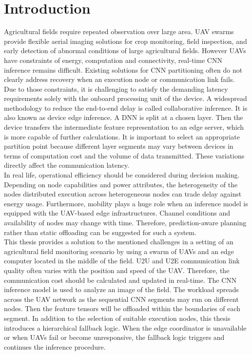 \chapter{Introduction}

Agricultural fields require repeated observation over large area. UAV swarms provide flexible aerial imaging solutions for crop monitoring, field inspection, and early detection of abnormal conditions of large agricultural fields. However UAVs have constraints of energy, computation and connectivity, real-time CNN inference remains difficult. Existing solutions for CNN partitioning often do not clearly address recovery when an execution node or communication link fails.\\

Due to those constraints, it is challenging to satisfy the demanding latency requirements solely with the onboard processing unit of the device. A widespread methodology to reduce the end-to-end delay is called collaborative inference. It is also known as device edge inference. A DNN is split at a chosen layer. Then the device transfers the intermediate feature representation to an edge server, which is more capable of further calculations. It is important to select an appropriate partition point because different layer segments may vary between devices in terms of computation cost and the volume of data transmitted. These variations directly affect the communication latency\cite{Mu2024FineGrain}. \\

In real life, operational efficiency should be considered during decision making. Depending on node capabilities and power attributes, the heterogeneity of the nodes distributed execution across heterogeneous nodes can trade delay against energy usage. Furthermore, mobility plays a huge role when an inference model is equipped with the UAV-based edge infrastructures. Channel conditions and availability of nodes may change with time. Therefore, prediction-aware planning rather than static offloading can be suggested for such a system\cite{EnergyEffUAV}.\\


This thesis provides a solution to the mentioned challenges in a setting of an agricultural field monitoring scenario by using a swarm of UAVs and an edge computer located in the middle of the field. U2U and U2E communication link quality often varies with the position and speed of the UAV. Therefore, the communication cost should be calculated and updated in real-time. The CNN inference model is used to analyze an image of the field. The workload spreads across the UAV network as the sequential CNN segments may run on different nodes. Then the feature tensors will be offloaded within the boundaries of each segment. In addition to the selection of suitable execution nodes, this thesis introduces a hierarchical fallback logic. When the edge coordinator is unavailable or when UAVs fail or become unresponsive, the fallback logic triggers and continues the inference procedure.


